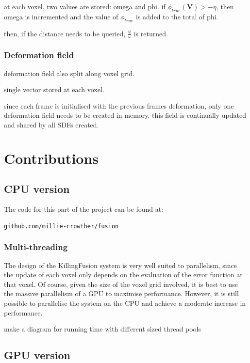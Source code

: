 \documentclass[12pt,twoside]{report}
\begin{document}
at each voxel, two values are stored: omega and phi.
if $\phi_{true}(\textbf{V}) > - \eta$, then omega is incremented and the value of $\phi_{true}$ is added to the total of phi.

then, if the distance needs to be queried, $\frac{\phi}{\omega}$ is returned.

\subsection{Deformation field}

deformation field also split along voxel grid.

single vector stored at each voxel.

since each frame is initialised with the previous frames deformation, only one deformation field needs to be created in memory. this field is continually updated and shared by all SDFs created.


\chapter{Contributions}


\section{CPU version}

The code for this part of the project can be found at:

\begin{center}
\verb|github.com/millie-crowther/fusion|
\end{center}

\subsection{Multi-threading}

The design of the KillingFusion system is very well suited to parallelism, since the update of each voxel only depends on the evaluation of the error function at that voxel. 
Of course, given the size of the voxel grid involved, it is best to use the massive parallelism of a GPU to maximise performance.
However, it is still possible to parallelise the system on the CPU and achieve a moderate increase in performance. 

make a diagram for running time with different sized thread pools

\section{GPU version}
\end{document}
